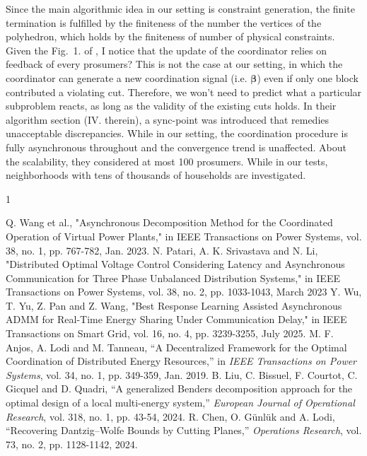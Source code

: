 \documentclass[11pt]{article}
\begin{document}
\begin{enumerate}
\begin{enumerate}
        Since the main algorithmic idea in our setting is constraint generation,
        the finite termination is fulfilled by the finiteness of the number the vertices
        of the polyhedron, which holds by the finiteness of number of physical constraints.
        Given the Fig.~1. of \cite{wu2025}, I notice that the update of the coordinator relies on feedback
        of every prosumers?
        This is not the case at our setting, in which the coordinator can generate a new coordination signal (i.e. $\boldsymbol{\beta}$) even if only one block contributed a violating cut.
        Therefore, we won't need to predict what a particular subproblem reacts, as long as the validity of the
        existing cuts holds.
        In their algorithm section (IV. therein), a sync-point was introduced that remedies unacceptable discrepancies.
        While in our setting, the coordination procedure is fully asynchronous throughout and the convergence
        trend is unaffected.
        About the scalability, they considered at most 100 prosumers.
        While in our tests, neighborhoods with tens of thousands of households are investigated.
    \end{enumerate}
\end{enumerate}


\begin{thebibliography}{1}


Q. Wang et al., "Asynchronous Decomposition Method for the Coordinated Operation of Virtual Power Plants," in IEEE Transactions on Power Systems, vol. 38, no. 1, pp. 767-782, Jan. 2023.
N. Patari, A. K. Srivastava and N. Li, "Distributed Optimal Voltage Control Considering Latency and Asynchronous Communication for Three Phase Unbalanced Distribution Systems," in IEEE Transactions on Power Systems, vol. 38, no. 2, pp. 1033-1043, March 2023
Y. Wu, T. Yu, Z. Pan and Z. Wang, "Best Response Learning Assisted Asynchronous ADMM for Real-Time Energy Sharing Under Communication Delay," in IEEE Transactions on Smart Grid, vol. 16, no. 4, pp. 3239-3255, July 2025.
M. F. Anjos, A. Lodi and M. Tanneau, ``A Decentralized Framework for the Optimal Coordination of Distributed Energy Resources,'' in \textit{IEEE Transactions on Power Systems}, vol. 34, no. 1, pp. 349-359, Jan. 2019.
B. Liu, C. Bissuel, F. Courtot, C. Gicquel and D. Quadri, ``A generalized Benders decomposition approach for the optimal design of a local multi-energy system,'' \textit{European Journal of Operational Research}, vol. 318, no. 1, pp. 43-54, 2024.
R. Chen, O. Günlük and A. Lodi, ``Recovering Dantzig–Wolfe Bounds by Cutting Planes,'' \textit{Operations Research}, vol. 73, no. 2, pp. 1128-1142, 2024.
    
\end{thebibliography}
\end{document}
